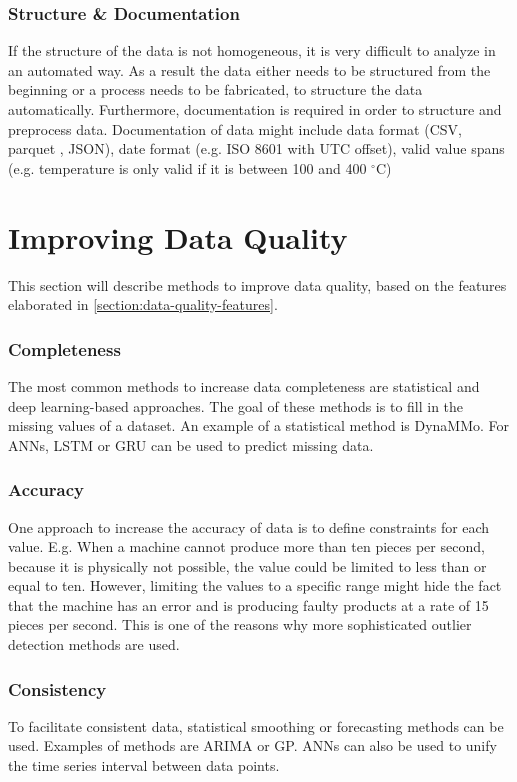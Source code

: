 \subsubsection{Structure \& Documentation}
If the structure of the data is not homogeneous, it is very difficult to analyze in an automated way. As a result the data either needs to be structured from the beginning or a process needs to be fabricated, to structure the data automatically. Furthermore, documentation is required in order to structure and preprocess data. Documentation of data might include data format (\ac{CSV}, parquet \cite{ApacheParquet2021}, \ac{JSON}), date format (e.g. ISO 8601 with UTC offset), valid value spans (e.g. temperature is only valid if it is between 100 and 400 $^{\circ}$C)
\cite{caiChallengesDataQuality2015}

\section{Improving Data Quality}\label{section:imrpoving-data-quality}
This section will describe methods to improve data quality, based on the features elaborated in \autoref{section:data-quality-features}.
\subsubsection{Completeness}
The most common methods to increase data completeness are statistical and deep learning-based approaches. The goal of these methods is to fill in the missing values of a dataset. An example of a statistical method is DynaMMo\cite{liDynaMMoMiningSummarization2009}. For \acp{ANN}, \ac{LSTM} or \ac{GRU} can be used to predict missing data. \cite{songIoTDataQuality2020}
\subsubsection{Accuracy}
One approach to increase the accuracy of data is to define constraints for each value. E.g. When a machine cannot produce more than ten pieces per second, because it is physically not possible, the value could be limited to less than or equal to ten. However, limiting the values to a specific range might hide the fact that the machine  has an error and is producing faulty products at a rate of 15 pieces per second. This is one of the reasons why more sophisticated outlier detection methods are used. \cite{songIoTDataQuality2020}

\subsubsection{Consistency}
To facilitate consistent data, statistical smoothing or forecasting methods can be used. Examples of methods are \ac{ARIMA} or \ac{GP}. \acp{ANN} can also be used to unify the time series interval between data points. \cite{songIoTDataQuality2020}

